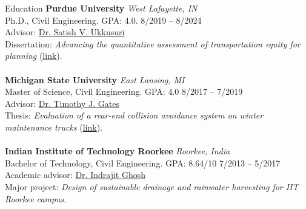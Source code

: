 \documentclass{CV} %
\begin{document}

\begin{rSection}{Education}
    {\bf Purdue University} \hfill {\em West Lafayette, IN}
    \\ Ph.D., Civil Engineering. GPA: 4.0. \hfill {8/2019 – 8/2024}
    \\ Advisor: \href{http://www.satishukkusuri.com/}{Dr. Satish V. Ukkusuri}
    \\ Dissertation: \emph{Advancing the quantitative assessment of transportation equity for planning} (\href{https://hammer.purdue.edu/articles/thesis/_b_Advancing_the_quantitative_assessment_of_transportation_equity_for_planning_b_/26321260}{link}). \\
    \\ {\bf Michigan State University} \hfill {\em East Lansing, MI} 
    \\ Master of Science, Civil Engineering. GPA: 4.0 \hfill {8/2017 – 7/2019}
    \\ Advisor: \href{https://www.egr.msu.edu/people/profile/gatestim}{Dr. Timothy J. Gates}
    \\ Thesis: \emph{Evaluation of a rear-end collision avoidance system on winter maintenance trucks} (\href{https://www.proquest.com/docview/2311960073?pq-origsite=gscholar&fromopenview=true&sourcetype=Dissertations%20&%20Theses}{link}). \\
    \\ {\bf Indian Institute of Technology Roorkee} \hfill {\em Roorkee, India}
    \\ Bachelor of Technology, Civil Engineering. GPA: 8.64/10 \hfill {7/2013 – 5/2017}
    \\ Academic advisor: \href{https://civil.iitr.ac.in/CE?Uid=indrafce}{Dr. Indrajit Ghosh}
    \\ Major project: \emph{Design of sustainable drainage and rainwater harvesting for IIT Roorkee campus}.
\end{rSection}
\end{document}
